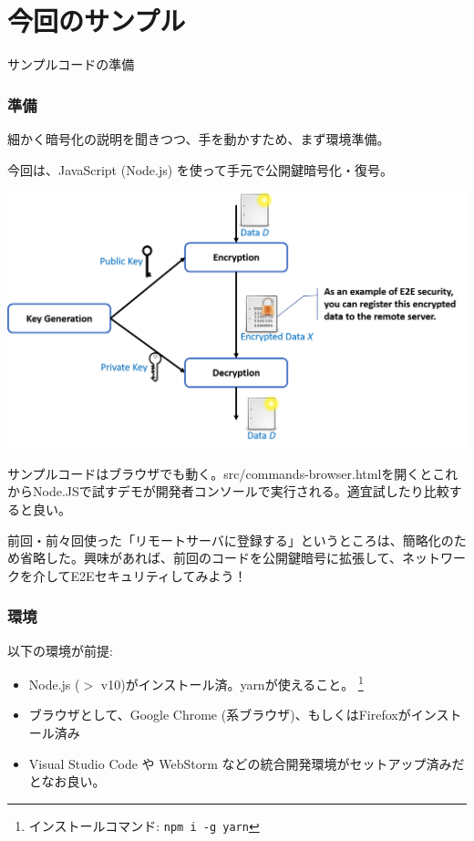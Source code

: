 \documentclass[12pt,dvipdfmx]{beamer}
\begin{document}
\section{今回のサンプル}
\begin{frame}
\centering
{\Large サンプルコードの準備}
\end{frame}

\begin{frame}
\frametitle{準備}
\small
細かく暗号化の説明を聞きつつ、手を動かすため、まず環境準備。

\alert{今回は、JavaScript (Node.js) を使って手元で公開鍵暗号化・復号。}

\begin{center}
 \includegraphics[width=0.8\linewidth]{Figs/pk-flow.png}%
\end{center}

\alert{サンプルコードはブラウザでも動く}。src/commands-browser.htmlを開くとこれからNode.JSで試すデモが開発者コンソールで実行される。適宜試したり比較すると良い。
\end{frame}

\begin{frame}
 
前回・前々回使った「リモートサーバに登録する」というところは、簡略化のため省略した。興味があれば、前回のコードを公開鍵暗号に拡張して、ネットワークを介してE2Eセキュリティしてみよう！
\end{frame}

\begin{frame}
\frametitle{環境}
以下の環境が前提:
\begin{itemize}
 \item Node.js ($>$ v10)がインストール済。yarnが使えること。 \footnote[frame]{インストールコマンド: \texttt{npm i -g yarn}}
 \item ブラウザとして、Google Chrome (系ブラウザ)、もしくはFirefoxがインストール済み
 \item Visual Studio Code や WebStorm などの統合開発環境がセットアップ済みだとなお良い。
\end{itemize}
\end{frame}
\end{document}
